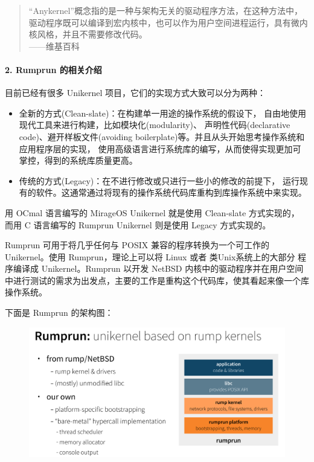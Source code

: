 \documentclass[UTF8,fontset=none,linespread=1.15]{ctexart}
\let\nosupcite\cite
\renewcommand*{\cite}[1]{\textsuperscript{\nosupcite{#1}}}
\begin{document}
\begin{quote}
“Anykernel”概念指的是一种与架构无关的驱动程序方法，在这种方法中，驱动程序既可以编译到宏内核中，也可以作为用户空间进程运行，具有微内核风格，并且不需要修改代码。\\
\hfill——维基百科
\end{quote}

\paragraph{2. Rumprun 的相关介绍}\cite{bib:23-mirageos}\cite{bib:24-rumrun}

目前已经有很多 Unikernel 项目，它们的实现方式大致可以分为两种：
\begin{itemize}
\item 全新的方式(Clean-slate)：在构建单一用途的操作系统的假设下，
自由地使用现代工具来进行构建，比如模块化(modularity)、
声明性代码(declarative code)、避开样板文件(avoiding boilerplate)等。并且从头开始思考操作系统和应用程序层的实现，
使用高级语言进行系统库的编写，从而使得实现更加可掌控，得到的系统库质量更高。
\item 传统的方式(Legacy)：在不进行修改或只进行一些小的修改的前提下，
运行现有的软件。这通常通过将现有的操作系统代码库重构到库操作系统中来实现。
\end{itemize}

用 OCmal 语言编写的 MirageOS Unikernel 就是使用 Clean-slate 方式实现的，
而用 C 语言编写的 Rumprun Unikernel 则是使用 Legacy 方式实现的。

Rumprun 可用于将几乎任何与 POSIX 兼容的程序转换为一个可工作的
Unikernel。使用 Rumprun，理论上可以将 Linux 或者 类Unix系统上的大部分
程序编译成 Unikernel。Rumprun 以开发 NetBSD 内核中的驱动程序并在用户空间
中进行测试的需求为出发点，主要的工作是重构这个代码库，使其看起来像一个库操作系统。

下面是 Rumprun 的架构图：
\begin{figure}[H]
\includegraphics[width=\linewidth]{pictures/rumprun-2.png}
\caption{}
\end{figure}
\end{document}
